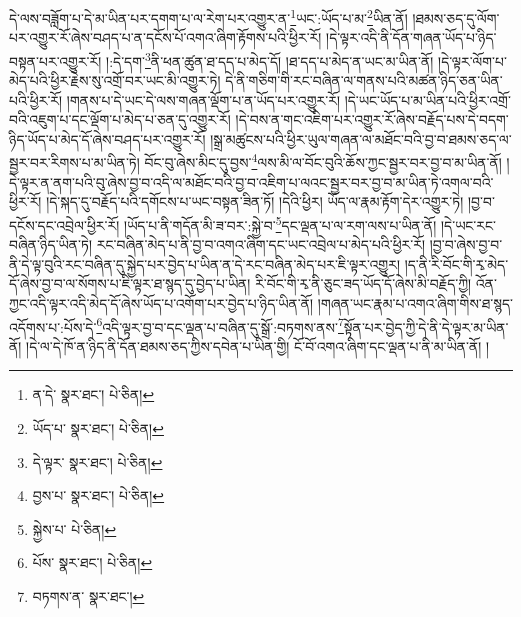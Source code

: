 དེ་ལས་བཟློག་པ་དེ་མ་ཡིན་པར་དགག་པ་ལ་རེག་པར་འགྱུར་ན་\footnote{ན་དེ་  སྣར་ཐང་།  པེ་ཅིན། }ཡང་:ཡོད་པ་མ་\footnote{ཡོད་པ་  སྣར་ཐང་།  པེ་ཅིན། }ཡིན་ནོ། །ཐམས་ཅད་དུ་ལོག་པར་འགྱུར་རོ་ཞེས་བཤད་པ་ན་དངོས་པོ་འགའ་ཞིག་རྟོགས་པའི་ཕྱིར་རོ། །དེ་ལྟར་འདི་ནི་དོན་གཞན་ཡོད་པ་ཉིད་བསྟན་པར་འགྱུར་རོ། །:དེ་དག་\footnote{དེ་ལྟར་  སྣར་ཐང་།  པེ་ཅིན། }ནི་ཕན་ཚུན་ཐ་དད་པ་མེད་དོ། །ཐ་དད་པ་མེད་ན་ཡང་མ་ཡིན་ནོ། །དེ་ལྟར་ལོག་པ་མེད་པའི་ཕྱིར་རྗེས་སུ་འགྲོ་བར་ཡང་མི་འགྱུར་ཏེ། དེ་ནི་གཅིག་གི་རང་བཞིན་ལ་གནས་པའི་མཚན་ཉིད་ཅན་ཡིན་པའི་ཕྱིར་རོ། །གནས་པ་དེ་ཡང་དེ་ལས་གཞན་ལྡོག་པ་ན་ཡོད་པར་འགྱུར་རོ། །དེ་ཡང་ཡོད་པ་མ་ཡིན་པའི་ཕྱིར་འགྲོ་བའི་འཇུག་པ་དང་ལྡོག་པ་མེད་པ་ཅན་དུ་འགྱུར་རོ། །དེ་བས་ན་གང་འཇིག་པར་འགྱུར་རོ་ཞེས་བརྗོད་པས་དེ་བདག་ཉིད་ཡོད་པ་མེད་དོ་ཞེས་བཤད་པར་འགྱུར་རོ། །སྒྲ་མཚུངས་པའི་ཕྱིར་ཡུལ་གཞན་ལ་མཐོང་བའི་བྱ་བ་ཐམས་ཅད་ལ་སྦྱར་བར་རིགས་པ་མ་ཡིན་ཏེ། བོང་བུ་ཞེས་མིང་དུ་བྱས་\footnote{བྱས་པ་  སྣར་ཐང་།  པེ་ཅིན། }ལས་མི་ལ་བོང་བུའི་ཆོས་ཀྱང་སྦྱར་བར་བྱ་བ་མ་ཡིན་ནོ། །དེ་ལྟར་ན་ནག་པའི་བུ་ཞེས་བྱ་བ་འདི་ལ་མཐོང་བའི་བྱ་བ་འཇིག་པ་ལའང་སྦྱར་བར་བྱ་བ་མ་ཡིན་ཏེ་འགལ་བའི་ཕྱིར་རོ། །དེ་སྐད་དུ་བརྗོད་པའི་དགོངས་པ་ཡང་བསྟན་ཟིན་ཏོ། །དེའི་ཕྱིར། ཡོད་ལ་རྣམ་རྟོག་དེར་འགྱུར་ཏེ། །བྱ་བ་དངོས་དང་འབྲེལ་ཕྱིར་རོ། །ཡོད་པ་ནི་གདོན་མི་ཟ་བར་:སྐྱེ་བ་\footnote{སྐྱེས་པ་  པེ་ཅིན། }དང་ལྡན་པ་ལ་རག་ལས་པ་ཡིན་ནོ། །དེ་ཡང་རང་བཞིན་ཉིད་ཡིན་ཏེ། རང་བཞིན་མེད་པ་ནི་བྱ་བ་འགའ་ཞིག་དང་ཡང་འབྲེལ་པ་མེད་པའི་ཕྱིར་རོ། །བྱ་བ་ཞེས་བྱ་བ་ནི་དེ་ལྟ་བུའི་རང་བཞིན་དུ་སྐྱེད་པར་བྱེད་པ་ཡིན་ན་དེ་རང་བཞིན་མེད་པར་ཇི་ལྟར་འགྱུར། །ད་ནི་རི་བོང་གི་རྭ་མེད་དོ་ཞེས་བྱ་བ་ལ་སོགས་པ་ཇི་ལྟར་ཐ་སྙད་དུ་བྱེད་པ་ཡིན། རི་བོང་གི་རྭ་ནི་ཅུང་ཟད་ཡོད་དོ་ཞེས་མི་བརྗོད་ཀྱི། འོན་ཀྱང་འདི་ལྟར་འདི་མེད་དོ་ཞེས་ཡོད་པ་འགོག་པར་བྱེད་པ་ཉིད་ཡིན་ནོ། །གཞན་ཡང་རྣམ་པ་འགའ་ཞིག་གིས་ཐ་སྙད་འདོགས་པ་:པོས་དེ་\footnote{པོས་  སྣར་ཐང་།  པེ་ཅིན། }འདི་ལྟར་བྱ་བ་དང་ལྡན་པ་བཞིན་དུ་སྒྲོ་:བཏགས་ནས་\footnote{བཏགས་ན་  སྣར་ཐང་། }སྟོན་པར་བྱེད་ཀྱི་དེ་ནི་དེ་ལྟར་མ་ཡིན་ནོ། །དེ་ལ་དེ་ཁོ་ན་ཉིད་ནི་དོན་ཐམས་ཅད་ཀྱིས་དབེན་པ་ཡིན་གྱི། ངོ་བོ་འགའ་ཞིག་དང་ལྡན་པ་ནི་མ་ཡིན་ནོ། །
